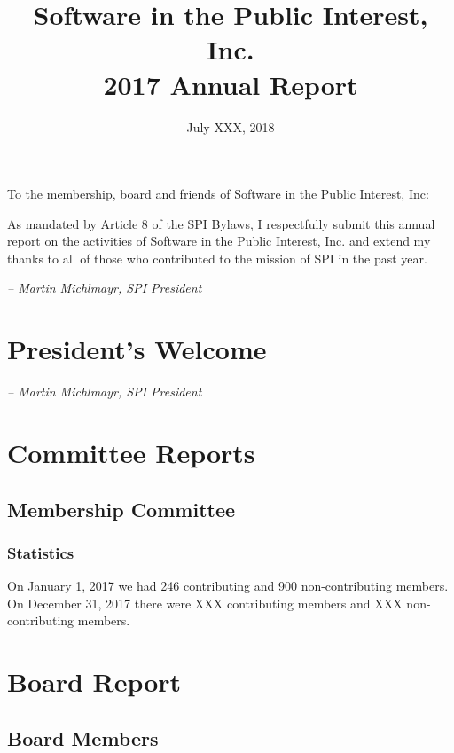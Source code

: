 \documentclass[letterpaper]{report}
\begin{document}
\title{Software in the Public Interest, Inc.\\
2017 Annual Report}
\date{July XXX, 2018}

\maketitle

To the membership, board and friends of Software in the Public Interest, Inc:

As mandated by Article 8 of the SPI Bylaws, I respectfully submit this annual
report on the activities of Software in the Public Interest, Inc. and extend my
thanks to all of those who contributed to the mission of SPI in the past year.

  \emph{-- Martin Michlmayr, SPI President}

\newpage

\tableofcontents

\newpage

\chapter{President's Welcome}
\label{sec:president}

  \emph{-- Martin Michlmayr, SPI President}

\chapter{Committee Reports}
\section{Membership Committee}

\subsection{Statistics}

On January 1, 2017 we had 246 contributing and 900 non-contributing members.
On December 31, 2017 there were XXX contributing members and XXX non-contributing
members.

\chapter{Board Report}
\section{Board Members}
\end{document}
